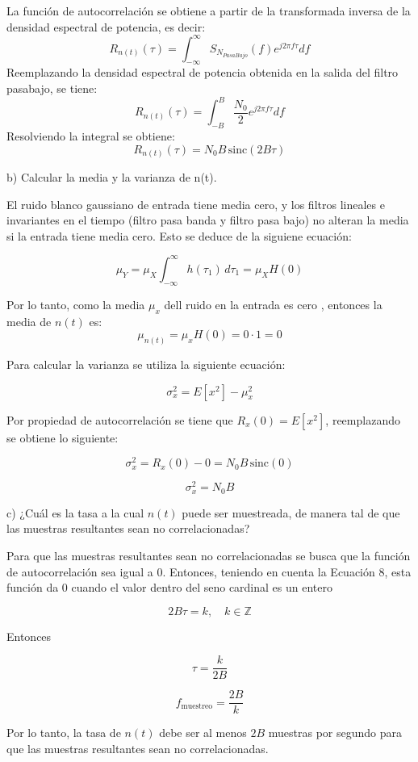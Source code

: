 	\noindent La función de autocorrelación se obtiene a partir de la transformada inversa de la densidad espectral de potencia, es decir:
		\[
			R_{n(t)}(\tau) = \int_{-\infty}^{\infty} S_{N_{PasaBajo}}(f) e^{j 2 \pi f \tau} df
		\]
	\noindent Reemplazando la densidad espectral de potencia obtenida en la salida del filtro pasabajo, se tiene:
		\[
			R_{n(t)}(\tau) = \int_{-B}^{B} \dfrac{N_0}{2} e^{j 2 \pi f \tau} df
		\]
	\noindent Resolviendo la integral se obtiene:
		\[
			R_{n(t)}(\tau) = N_0 B \, \text{sinc}(2 B \tau)
		\]
	

\noindent b) Calcular la media y la varianza de n(t).\par
\bigskip

\noindent El ruido blanco gaussiano de entrada tiene media cero, y los filtros lineales e invariantes en el tiempo (filtro pasa banda y filtro
	pasa bajo) no alteran la media si la entrada tiene media cero. Esto se deduce de la siguiene ecuación:
	
		\[
			\mu_Y = \mu_X \int_{-\infty}^{\infty} h(\tau_1)\, d\tau_1 = \mu_X H(0)
		\]

	\noindent Por lo tanto, como la media $\mu_x$ dell ruido en la entrada es cero , entonces la media de $n(t)$ es:
		\[
			\mu_{n(t)} = \mu_x H(0) = 0 \cdot 1 = 0
		\]
	
	\noindent Para calcular la varianza se utiliza la siguiente ecuación:

		\[
		\sigma_x^2 = E[x^2] - \mu_x^2
		\]

	\noindent Por propiedad de autocorrelación se tiene que \(R_x(0) = E[x^2]\), reemplazando se obtiene lo siguiente:

		\[
		\sigma_x^2 = R_x(0) - 0 = N_0 B \, \text{sinc}(0)
		\]

		\[
		\sigma_x^2 = N_0 B
		\]


\noindent c) ¿Cuál es la tasa a la cual $n(t)$ puede ser muestreada, de manera tal de que las muestras resultantes sean no correlacionadas? \par
\bigskip

\noindent Para que las muestras resultantes sean no correlacionadas se busca que la función de autocorrelación sea igual a 0. Entonces, teniendo en cuenta la Ecuación 8, 
esta función da 0 cuando el valor dentro del seno cardinal es un entero
	

	\[
		2B\tau = k, \quad k \in \mathbb{Z}
	\]

\noindent Entonces

	\[
		\tau = \frac{k}{2B}
	\]

	\[
		f_{\text{muestreo}} = \frac{2B}{k}
	\]

\noindent Por lo tanto, la tasa de \(n(t)\) debe ser al menos \(2B\) muestras por segundo para que las muestras 
resultantes sean no correlacionadas.
